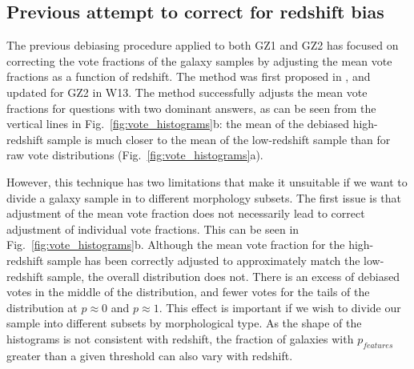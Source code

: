 \documentclass[useAMS,usenatbib]{mn2e}
\begin{document}
\subsection{Previous attempt to correct for redshift bias}
\label{sec:previous_method}

The previous debiasing procedure applied to both GZ1 and GZ2 has focused on correcting the vote fractions of the galaxy samples by adjusting the mean vote fractions as a function of redshift. The method was first proposed in \cite{Bamford_09}, and updated for GZ2 in W13. The method successfully adjusts the mean vote fractions for questions with two dominant answers, as can be seen from the vertical lines in Fig.~\ref{fig:vote_histograms}b: the mean of the debiased high-redshift sample is much closer to the mean of the low-redshift sample than for raw vote distributions (Fig.~\ref{fig:vote_histograms}a).

However, this technique has two limitations that make it unsuitable if we want to divide a galaxy sample in to different morphology subsets.  The first issue is that adjustment of the mean vote fraction does not necessarily lead to correct adjustment of individual vote fractions. This can be seen in Fig.~\ref{fig:vote_histograms}b.  Although the mean vote fraction for the high-redshift sample has been correctly adjusted to approximately match the low-redshift sample, the overall distribution does not. There is an excess of debiased votes in the middle of the distribution, and fewer votes for the tails of the distribution at $p \approx 0$ and $p \approx 1$. This effect is important if we wish to divide our sample into different subsets by morphological type. As the shape of the histograms is not consistent with redshift, the fraction of galaxies with $p_{features}$ greater than a given threshold can also vary with redshift. 
\end{document}
